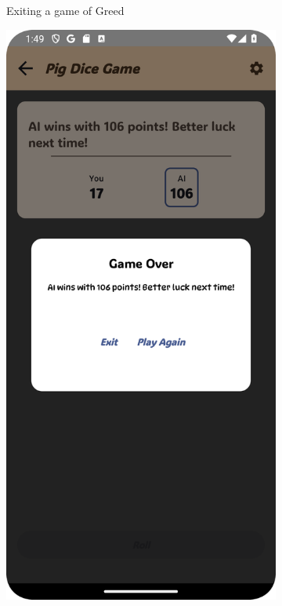 \begin{figure}[h]
\begin{subfigure}[b]{0.27\textwidth}
        \caption{Exiting a game of Greed}
    \end{subfigure}
    \hfill
    \begin{subfigure}[b]{0.27\textwidth}
        \includegraphics[width=\textwidth]{img/pig board2.png}

\end{subfigure}
\end{figure}
